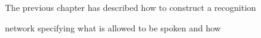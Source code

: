 






































%




%












The previous chapter has described how to construct a recognition


network specifying what is allowed to be spoken and how


